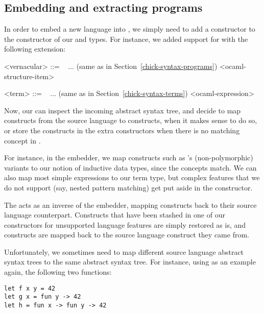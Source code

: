 \subsection{Embedding and extracting programs}\label{embedding-extracting}

In order to embed a new language into \Chick{}, we simply need to add a
constructor to the constructor of our  and
 types.  For instance, we added support for \OCaml{} with the
following extension:

\begin{grammar}
<vernacular> ::= \ %
\alt ... \hfill (same as in Section~\ref{chick-syntax-programs})
\alt {} <ocaml-structure-item>

<term> ::= \ %
\alt ... \hfill (same as in Section~\ref{chick-syntax-terms})
\alt {} <ocaml-expression>
\end{grammar}

Now, our  can inspect the incoming abstract syntax tree, and
decide to map constructs from the source language to \Chick{} constructs, when
it makes sense to do so, or store the constructs in the extra constructors when
there is no matching concept in \Chick{}.

For instance, in the \OCaml{} embedder, we map constructs such as \OCaml{}'s
(non-polymorphic) variants to our notion of inductive data types, since the
concepts match.  We can also map most simple expressions to our term type, but
complex features that we do not support (say, nested pattern matching) get put
aside in the  constructor.

The  acts as an inverse of the embedder, mapping \Chick{}
constructs back to their source language counterpart.  Constructs that have
been stashed in one of our constructors for unsupported language features
are simply restored as is, and \Chick{} constructs are mapped back to the
source language construct they came from.

Unfortunately, we sometimes need to map different source language abstract
syntax trees to the same \Chick{} abstract syntax tree.  For instance,
using \OCaml{} as an example again, the following two functions:

\begin{verbatim}
let f x y = 42
let g x = fun y -> 42
let h = fun x -> fun y -> 42
\end{verbatim}

